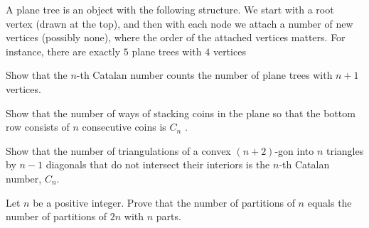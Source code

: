 A plane tree is an object with the following structure. We start with a root vertex
(drawn at the top), and then with each node we attach a number of new vertices
(possibly none), where the order of the attached vertices matters. For instance, there
are exactly $5$ plane trees with $4$ vertices
\begin{problem}
Show that the $n$-th Catalan number counts the number of plane trees with
$n + 1$ vertices.
\end{problem}


\begin{problem}
Show that the number of ways of stacking coins in the plane so that the bottom
row consists of $n$ consecutive coins is $C_n$ .
\end{problem}



\begin{problem}
Show that the number of triangulations of a convex $(n + 2)$-gon into $n$ triangles
by $n - 1$ diagonals that do not intersect their interiors is the $n$-th Catalan number,
$C_n$.
\end{problem}

\begin{problem}
Let $n$ be a positive integer. Prove that the number of partitions of $n$ equals the
number of partitions of $2n$ with $n$ parts.
\end{problem}


